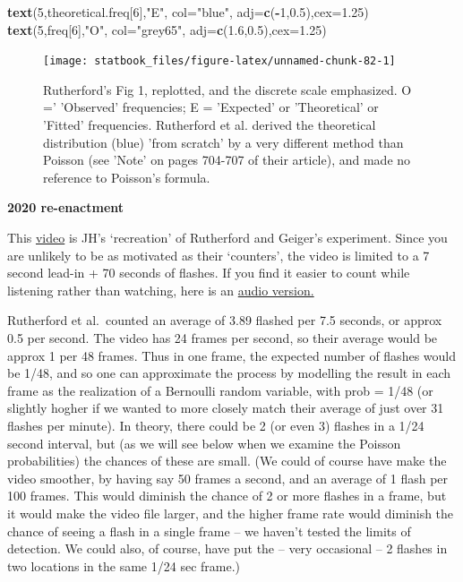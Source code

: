 \documentclass[]{book}
\newenvironment{Shaded}{\begin{snugshade}}{\end{snugshade}}
\newcommand{\DataTypeTok}[1]{\textcolor[rgb]{0.13,0.29,0.53}{#1}}
\newcommand{\DecValTok}[1]{\textcolor[rgb]{0.00,0.00,0.81}{#1}}
\newcommand{\FloatTok}[1]{\textcolor[rgb]{0.00,0.00,0.81}{#1}}
\newcommand{\KeywordTok}[1]{\textcolor[rgb]{0.13,0.29,0.53}{\textbf{#1}}}
\newcommand{\NormalTok}[1]{#1}
\newcommand{\OperatorTok}[1]{\textcolor[rgb]{0.81,0.36,0.00}{\textbf{#1}}}
\newcommand{\StringTok}[1]{\textcolor[rgb]{0.31,0.60,0.02}{#1}}
\begin{document}
\begin{Shaded}
\begin{Highlighting}[]
\KeywordTok{text}\NormalTok{(}\DecValTok{5}\NormalTok{,theoretical.freq[}\DecValTok{6}\NormalTok{],}\StringTok{"E"}\NormalTok{,}
     \DataTypeTok{col=}\StringTok{"blue"}\NormalTok{, }\DataTypeTok{adj=}\KeywordTok{c}\NormalTok{(}\OperatorTok{-}\DecValTok{1}\NormalTok{,}\FloatTok{0.5}\NormalTok{),}\DataTypeTok{cex=}\FloatTok{1.25}\NormalTok{)}
\KeywordTok{text}\NormalTok{(}\DecValTok{5}\NormalTok{,freq[}\DecValTok{6}\NormalTok{],}\StringTok{"O"}\NormalTok{,}
     \DataTypeTok{col=}\StringTok{"grey65"}\NormalTok{, }\DataTypeTok{adj=}\KeywordTok{c}\NormalTok{(}\FloatTok{1.6}\NormalTok{,}\FloatTok{0.5}\NormalTok{),}\DataTypeTok{cex=}\FloatTok{1.25}\NormalTok{)}
\end{Highlighting}
\end{Shaded}

\begin{figure}

\texttt{[image: statbook\_files/figure-latex/unnamed-chunk-82-1]} \hfill{}

\caption{Rutherford's Fig 1, replotted, and the discrete scale emphasized. O =' 'Observed' frequencies; E = 'Expected' or 'Theoretical' or 'Fitted' frequencies. Rutherford et al. derived the  theoretical distribution (blue) 'from scratch' by a very different method than Poisson (see 'Note' on pages 704-707 of their article), and made no reference to Poisson's formula.}\label{fig:unnamed-chunk-82}
\end{figure}

\textbf{2020 re-enactment}

This \href{http://www.medicine.mcgill.ca/epidemiology/hanley/Rutherford/minute-001.mp4}{video} is JH's `recreation' of
Rutherford and Geiger's experiment. Since you are unlikely to be as motivated as their `counters', the video is limited to a 7 second lead-in + 70 seconds of flashes. If you find it easier to count while listening rather than watching, here is an \href{http://www.medicine.mcgill.ca/epidemiology/hanley/Rutherford/minute-001.wav}{audio version.}

Rutherford et al.~counted an average of 3.89 flashed per 7.5 seconds, or approx 0.5 per second. The video has 24 frames per second, so their average would be approx 1 per 48 frames. Thus in one frame, the expected number of flashes would be 1/48, and so one can approximate the process by modelling the result in each frame as the realization of a Bernoulli random variable, with prob = 1/48 (or slightly hogher if we wanted to more closely match their average of just over 31 flashes per minute). In theory, there could be 2 (or even 3) flashes in a 1/24 second interval, but (as we will see below when we examine the Poisson probabilities) the chances of these are small. (We could of course have make the video smoother, by having say 50 frames a second, and an average of 1 flash per 100 frames. This would diminish the chance of 2 or more flashes in a frame, but it would make the video file larger, and the higher frame rate would diminish the chance of seeing a flash in a single frame -- we haven't tested the limits of detection. We could also, of course, have put the -- very occasional -- 2 flashes in two locations in the same 1/24 sec frame.)
\end{document}
